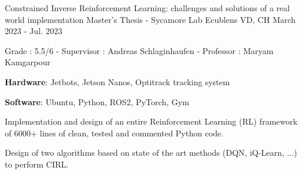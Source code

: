 
% 

\begin{cventries}

  \cventry
    {Constrained Inverse Reinforcement Learning: challenges and solutions of a real world implementation} %
    {Master's Thesis - Sycamore Lab} %
    {Ecublens VD, CH} %
    {March 2023 - Jul. 2023} %
    {
    Grade : 5.5/6 - Supervisor : Andreas Schlaginhaufen - Professor : Maryam Kamgarpour\vspace{1.5em}
      \begin{cvitems} %
        \item \textbf{Hardware}: Jetbots, Jetson Nanos, Optitrack tracking system 
        \item \textbf{Software}: Ubuntu, Python, ROS2, PyTorch, Gym
        \item Implementation and design of an entire Reinforcement Learning (RL) framework of 6000+ lines of clean, tested and commented Python code.
        \item Design of two algorithms based on state of the art methods (DQN, iQ-Learn, ...) to perform CIRL.
      \end{cvitems}
    }
    

\end{cventries}
